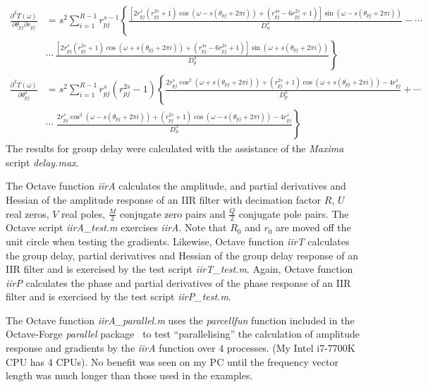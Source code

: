 \documentclass[a4paper,twoside,10pt,english]{report}
\begin{document}
\begin{raggedbottom}
\begin{align*}
\frac{\partial^{2}T\left(\omega\right)}{\partial\theta_{pj}\partial r_{pj}} &= s^{2}\sum_{i=1}^{R-1}r_{pj}^{s-1}\left\{ \frac{\left[2r_{pj}^{s}\left(r_{pj}^{2s}+1\right)\cos\left(\omega-s\left(\theta_{pj}+2\pi i\right)\right)+\left(r_{pj}^{4s}-6r_{pj}^{2s}+1\right)\right]\sin\left(\omega-s\left(\theta_{pj}+2\pi i\right)\right)}{D_{n}^{3}}-\cdots\right.\\
 & \left.\cdots\,\frac{\left[2r_{pj}^{s}\left(r_{pj}^{2s}+1\right)\cos\left(\omega+s\left(\theta_{pj}+2\pi i\right)\right)+\left(r_{pj}^{4s}-6r_{pj}^{2s}+1\right)\right]\sin\left(\omega+s\left(\theta_{pj}+2\pi i\right)\right)}{D_{p}^{3}}\right\} \\
\frac{\partial^{2}T\left(\omega\right)}{\partial\theta_{pj}^{2}} &= s^{2}\sum_{i=1}^{R-1}r_{pj}^{s}\left(r_{pj}^{2s}-1\right)\left\{ \frac{2r_{pj}^{s}\cos^{2}\left(\omega+s\left(\theta_{pj}+2\pi i\right)\right)+\left(r_{pj}^{2s}+1\right)\cos\left(\omega+s\left(\theta_{pj}+2\pi i\right)\right)-4r_{pj}^{s}}{D_{p}^{3}}+\cdots\right.\\
 & \left.\cdots\;\frac{2r_{pj}^{s}\cos^{2}\left(\omega-s\left(\theta_{pj}+2\pi i\right)\right)+\left(r_{pj}^{2s}+1\right)\cos\left(\omega-s\left(\theta_{pj}+2\pi i\right)\right)-4r_{pj}^{s}}{D_{n}^{3}}\right\} 
\end{align*}
The results for group delay were calculated with the assistance of
the \emph{Maxima}~\cite{Maxima_website} script \emph{delay.max}.

The Octave function \emph{iirA} calculates the amplitude, and partial
derivatives and Hessian of the amplitude response of an IIR filter with
decimation factor $R$, $U$ real zeros, $V$ real poles, $\frac{M}{2}$ conjugate
zero pairs and $\frac{Q}{2}$ conjugate pole pairs. The Octave script
\emph{iirA\_test.m} exercises \emph{iirA}. Note that $R_{0}$ and $r_{0}$ are
moved off the unit circle when testing the gradients. Likewise, Octave function
\emph{iirT} calculates the group delay, partial derivatives and Hessian of the
group delay response of an IIR filter and is exercised by the test script
\emph{iirT\_test.m}. Again, Octave function \emph{iirP} calculates the phase and
partial derivatives of the phase response of an IIR filter and is exercised by
the test script \emph{iirP\_test.m}.

The Octave function \emph{iirA\_parallel.m} uses the \emph{parcellfun} function
included in the Octave-Forge \emph{parallel}
package~\cite{OctaveForge_ParallelPackage} to test ``parallelising'' the 
calculation of amplitude response and gradients by the \emph{iirA} function 
over $4$ processes. (My Intel i7-7700K CPU has $4$ CPUs). No benefit was seen on 
my PC until the frequency vector length was much longer than those used in the
examples.
\end{raggedbottom}
\cleardoublepage
\end{document}
